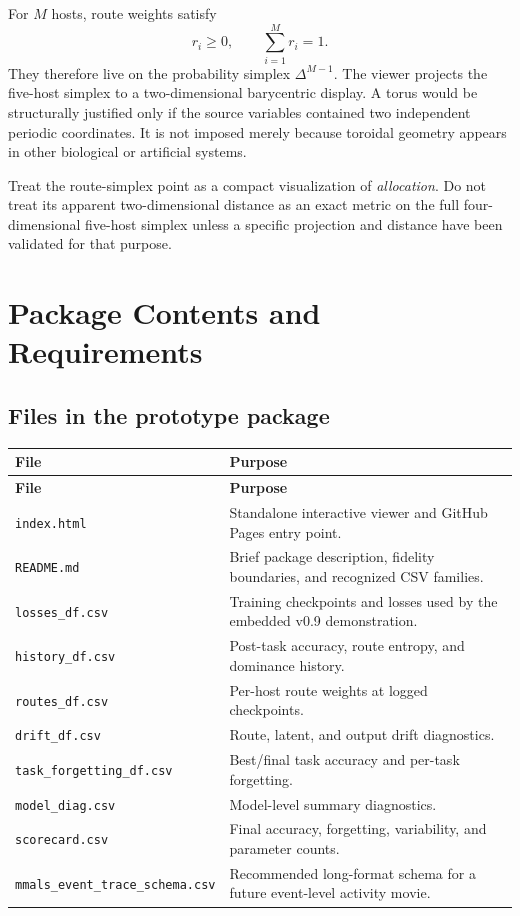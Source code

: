 \documentclass[11pt,a4paper]{article}
\newcommand{\code}[1]{\texttt{#1}}
\begin{document}
For $M$ hosts, route weights satisfy
\[
  r_i \ge 0, \qquad \sum_{i=1}^{M} r_i = 1.
\]
They therefore live on the probability simplex $\Delta^{M-1}$. The viewer projects the five-host simplex to a two-dimensional barycentric display. A torus would be structurally justified only if the source variables contained two independent periodic coordinates. It is not imposed merely because toroidal geometry appears in other biological or artificial systems.

\begin{sciencebox}
Treat the route-simplex point as a compact visualization of \emph{allocation}. Do not treat its apparent two-dimensional distance as an exact metric on the full four-dimensional five-host simplex unless a specific projection and distance have been validated for that purpose.
\end{sciencebox}

\section{Package Contents and Requirements}

\subsection{Files in the prototype package}

\begin{longtable}{@{}P{55mm}P{108mm}@{}}
\toprule
\textbf{File} & \textbf{Purpose}\\
\midrule
\endfirsthead
\toprule
\textbf{File} & \textbf{Purpose}\\
\midrule
\endhead
\code{index.html} & Standalone interactive viewer and GitHub Pages entry point.\\
\code{README.md} & Brief package description, fidelity boundaries, and recognized CSV families.\\
\code{losses\_df.csv} & Training checkpoints and losses used by the embedded v0.9 demonstration.\\
\code{history\_df.csv} & Post-task accuracy, route entropy, and dominance history.\\
\code{routes\_df.csv} & Per-host route weights at logged checkpoints.\\
\code{drift\_df.csv} & Route, latent, and output drift diagnostics.\\
\code{task\_forgetting\_df.csv} & Best/final task accuracy and per-task forgetting.\\
\code{model\_diag.csv} & Model-level summary diagnostics.\\
\code{scorecard.csv} & Final accuracy, forgetting, variability, and parameter counts.\\
\code{mmals\_event\_trace\_schema.csv} & Recommended long-format schema for a future event-level activity movie.\\
\bottomrule
\end{longtable}
\end{document}

